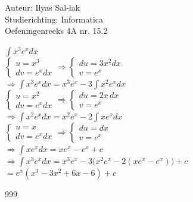 \documentclass[a4paper]{article}
\newcommand{\dint}{\displaystyle\int}
\begin{document}
\noindent \large Auteur: Ilyas Sal-lak \\
\noindent \large Studierichting: Informatica\\
\noindent \large Oefeningenreeks 4A nr. 15.2\\
\medskip
\normalsize

$\dint x^3 e^x dx$ \\

$\left\{
\begin{array}{l}
u = x^3 \\
dv = e^x dx
\end{array}
\right.
\Rightarrow
\left\{
\begin{array}{l}
du = 3x^2 dx \\
v = e^x
\end{array}
\right.$ \\

$\Rightarrow \dint x^3 e^x dx = x^3 e^x - 3 \dint x^2 e^x dx$ \\

$\left\{
\begin{array}{l}
u = x^2 \\
dv = e^x dx
\end{array}
\right.
\Rightarrow
\left\{
\begin{array}{l}
du = 2x \, dx \\
v = e^x
\end{array}
\right.$ \\

$\Rightarrow \dint x^2 e^x dx = x^2 e^x - 2 \dint x e^x dx$ \\

$\left\{
\begin{array}{l}
u = x \\
dv = e^x dx
\end{array}
\right.
\Rightarrow
\left\{
\begin{array}{l}
du = dx \\
v = e^x
\end{array}
\right.$ \\

$\Rightarrow \dint x e^x dx = x e^x - e^x + c$ \\

$\Rightarrow \dint x^3 e^x dx = x^3 e^x - 3\bigl(x^2 e^x - 2(x e^x - e^x)\bigr) + c$ \\

$= e^x(x^3 - 3x^2 + 6x - 6) + c$

\begin{thebibliography}{999}
\end{thebibliography}
\end{document}
